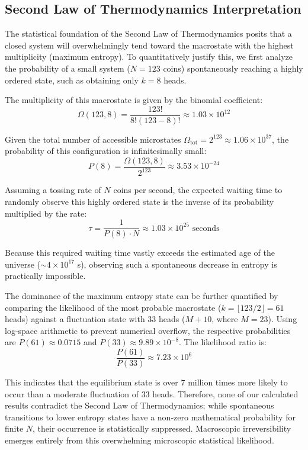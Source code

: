 \documentclass[10pt, a4paper]{article}
\begin{document}
\subsection{Second Law of Thermodynamics Interpretation}

The statistical foundation of the Second Law of Thermodynamics posits that a closed system will overwhelmingly tend toward the macrostate with the highest multiplicity (maximum entropy). To quantitatively justify this, we first analyze the probability of a small system ($N = 123$ coins) spontaneously reaching a highly ordered state, such as obtaining only $k = 8$ heads. 

The multiplicity of this macrostate is given by the binomial coefficient:
$$\Omega(123, 8) = \frac{123!}{8!(123-8)!} \approx 1.03 \times 10^{12}$$

Given the total number of accessible microstates $\Omega_{\text{tot}} = 2^{123} \approx 1.06 \times 10^{37}$, the probability of this configuration is infinitesimally small:
$$P(8) = \frac{\Omega(123, 8)}{2^{123}} \approx 3.53 \times 10^{-24}$$

Assuming a tossing rate of $N$ coins per second, the expected waiting time to randomly observe this highly ordered state is the inverse of its probability multiplied by the rate:
$$\tau = \frac{1}{P(8) \cdot N} \approx 1.03 \times 10^{25} \text{ seconds}$$

Because this required waiting time vastly exceeds the estimated age of the universe ($\sim 4 \times 10^{17}$ s), observing such a spontaneous decrease in entropy is practically impossible.

The dominance of the maximum entropy state can be further quantified by comparing the likelihood of the most probable macrostate ($k = \lfloor 123/2 \rfloor = 61$ heads) against a fluctuation state with $33$ heads ($M+10$, where $M=23$). Using log-space arithmetic to prevent numerical overflow, the respective probabilities are $P(61) \approx 0.0715$ and $P(33) \approx 9.89 \times 10^{-8}$. The likelihood ratio is:
$$\frac{P(61)}{P(33)} \approx 7.23 \times 10^6$$

This indicates that the equilibrium state is over 7 million times more likely to occur than a moderate fluctuation of 33 heads. Therefore, none of our calculated results contradict the Second Law of Thermodynamics; while spontaneous transitions to lower entropy states have a non-zero mathematical probability for finite $N$, their occurrence is statistically suppressed. Macroscopic irreversibility emerges entirely from this overwhelming microscopic statistical likelihood.
\end{document}
